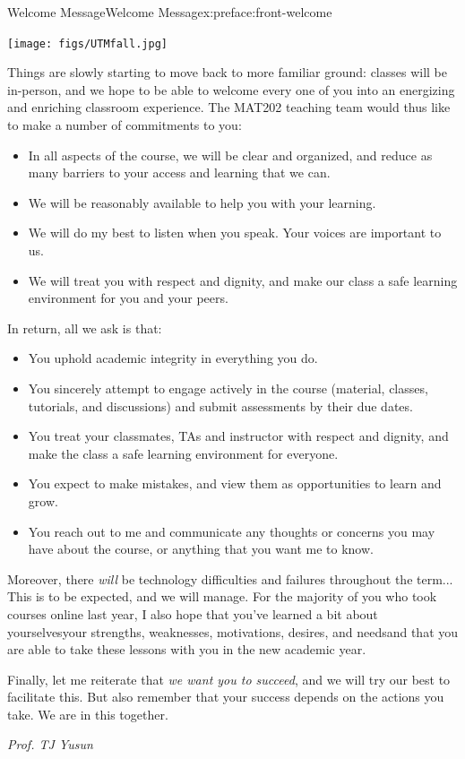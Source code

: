 \documentclass[oneside,10pt,]{book}
\numberwithin{equation}{section}
\begin{document}
\begin{preface}{Welcome Message}{}{Welcome Message}{}{}{x:preface:front-welcome}
\begin{sidebyside}{1}{0.15}{0.15}{0}
\begin{sbspanel}{0.7}%
\texttt{[image: figs/UTMfall.jpg]}
\end{sbspanel}%
\end{sidebyside}%
\par
Things are slowly starting to move back to more familiar ground: classes will be in-person, and we hope to be able to welcome every one of you into an energizing and enriching classroom experience. The MAT202 teaching team would thus like to make a number of commitments to you:%
\begin{itemize}[label=\textbullet]
\item{}In all aspects of the course, we will be clear and organized, and reduce as many barriers to your access and learning that we can.%
\item{}We will be reasonably available to help you with your learning.%
\item{}We will do my best to listen when you speak. Your voices are important to us.%
\item{}We will treat you with respect and dignity, and make our class a safe learning environment for you and your peers.%
\end{itemize}
In return, all we ask is that:%
\begin{itemize}[label=\textbullet]
\item{}You uphold academic integrity in everything you do.%
\item{}You sincerely attempt to engage actively in the course (material, classes, tutorials, and discussions) and submit assessments by their due dates.%
\item{}You treat your classmates, TAs and instructor with respect and dignity, and make the class a safe learning environment for everyone.%
\item{}You expect to make mistakes, and view them as opportunities to learn and grow.%
\item{}You reach out to me and communicate any thoughts or concerns you may have about the course, or anything that you want me to know.%
\end{itemize}
%
\par
Moreover, there \emph{will} be technology difficulties and failures throughout the term... This is to be expected, and we will manage. For the majority of you who took courses online last year, I also hope that you've learned a bit about yourselves\textemdash{}your strengths, weaknesses, motivations, desires, and needs\textemdash{}and that you are able to take these lessons with you in the new academic year.%
\par
Finally, let me reiterate that \emph{we want you to succeed}, and we will try our best to facilitate this. But also remember that your success depends on the actions you take. We are in this together.%
\par
\emph{Prof. TJ Yusun}%
\end{preface}
\end{document}
